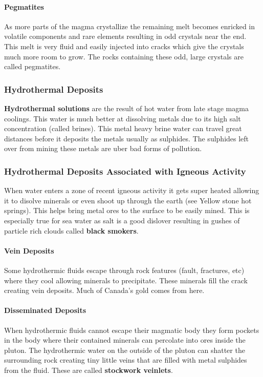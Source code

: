 \documentclass{article}
\begin{document}
\paragraph{Pegmatites} %
\label{par:pegmatites}
As more parts of the magma crystallize the remaining melt becomes enricked in volatile components and rare elements resulting in odd crystals near the end. This melt is very fluid and easily injected into cracks which give the crystals much more room to grow. The rocks containing these odd, large crystals are called pegmatites.

\subsubsection{Hydrothermal Deposits} %
\label{sub:hydrothermal_deposits}
\textbf{Hydrothermal solutions} are the result of hot water from late stage magma coolings. This water is much better at dissolving metals  due to its high salt concentration (called brines). This metal heavy brine water can travel great distances before it deposits the metals usually as sulphides. The sulphides left over from mining these metals are uber bad forms of pollution.

\subsubsection{Hydrothermal Deposits Associated with Igneous Activity} %
\label{sub:hydrothermal_deposits_associated_with_igneous_activity}
When water enters a zone of recent igneous activity it gets super heated allowing it to disolve minerals or even shoot up through the earth (see Yellow stone hot springs). This helps bring metal ores to the surface to be easily mined. This is especially true for sea water as salt is a good dislover resulting in gushes of particle rich clouds called \textbf{black smokers}.

\paragraph{Vein Deposits} %
\label{par:vein_deposits}
Some hydrothermic fluids escape through rock features (fault, fractures, etc) where they cool allowing minerals to precipitate. These minerals fill the crack creating vein deposits. Much of Canada's gold comes from here.

\paragraph{Disseminated Deposits} %
\label{par:disseminated_deposits}
When hydrothermic fluids cannot escape their magmatic body they form pockets in the body where their contained minerals can percolate into ores inside the pluton. The hydrothermic water on the outside of the pluton can shatter the surrounding rock creating tiny little veins that are filled with metal sulphides from the fluid. These are called \textbf{stockwork veinlets}.
\end{document}
